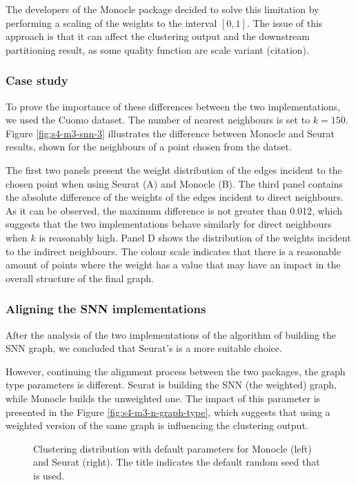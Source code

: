 The developers of the Monocle package decided to solve this limitation by performing a scaling of the weights to the interval $[0, 1]$. The issue of this approach is that it can affect the clustering output and the downstream partitioning result, as some quality function are scale variant (citation).

\subsubsection{Case study}
To prove the importance of these differences between the two implementations, we used the Cuomo \cite{Cuomo2020} dataset. The number of nearest neighbours is set to $k = 150$. Figure \ref{fig:s4-m3-snn-3} illustrates the difference between Monocle and Seurat results, shown for the neighbours of a point chosen from the datset.

The first two panels present the weight distribution of the edges incident to the chosen point when using Seurat (A) and Monocle (B). The third panel contains the absolute difference of the weights of the edges incident to direct neighbours. As it can be observed, the maximum difference is not greater than 0.012, which suggests that the two implementations behave similarly for direct neighbours when $k$ is reasonably high. Panel D shows the distribution of the weights incident to the indirect neighbours. The colour scale indicates that there is a reasonable amount of points where the weight has a value that may have an impact in the overall structure of the final graph.

\subsubsection{Aligning the SNN implementations}
After the analysis of the two implementations of the algorithm of building the SNN graph, we concluded that Seurat's is a more suitable choice. 

However, continuing the alignment process between the two packages, the graph type parameters is different. Seurat is building the SNN (the weighted) graph, while Monocle builds the unweighted one. The impact of this parameter is presented in the Figure \ref{fig:s4-m3-n-graph-type}, which suggests that using a weighted version of the same graph is influencing the clustering output.

\begin{figure}[H]
    \centering
    \caption{\label{fig:s4-m3-graph-base}Clustering distribution with default parameters for Monocle (left) and Seurat (right). The title indicates the default random seed that is used.}
\end{figure}

